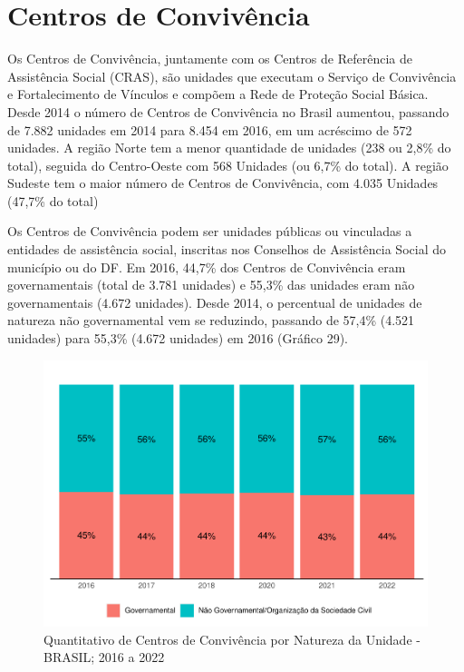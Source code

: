 \documentclass[
  brazilian]{report}
\begin{document}
\hypertarget{centros-de-convivuxeancia}{%
\section{Centros de Convivência}\label{centros-de-convivuxeancia}}

Os Centros de Convivência, juntamente com os Centros de Referência de
Assistência Social (CRAS), são unidades que executam o Serviço de
Convivência e Fortalecimento de Vínculos e compõem a Rede de Proteção
Social Básica. Desde 2014 o número de Centros de Convivência no Brasil
aumentou, passando de 7.882 unidades em 2014 para 8.454 em 2016, em um
acréscimo de 572 unidades. A região Norte tem a menor quantidade de
unidades (238 ou 2,8\% do total), seguida do Centro-Oeste com 568
Unidades (ou 6,7\% do total). A região Sudeste tem o maior número de
Centros de Convivência, com 4.035 Unidades (47,7\% do total)

Os Centros de Convivência podem ser unidades públicas ou vinculadas a
entidades de assistência social, inscritas nos Conselhos de Assistência
Social do município ou do DF. Em 2016, 44,7\% dos Centros de Convivência
eram governamentais (total de 3.781 unidades) e 55,3\% das unidades eram
não governamentais (4.672 unidades). Desde 2014, o percentual de
unidades de natureza não governamental vem se reduzindo, passando de
57,4\% (4.521 unidades) para 55,3\% (4.672 unidades) em 2016 (Gráfico
29).

\begin{figure}
\includegraphics{Censo-SUAS-2022_files/figure-latex/centro-conv-natureza-1} \caption[Quantitativo de Centros de Convivência por Natureza da Unidade - BRASIL]{Quantitativo de Centros de Convivência por Natureza da Unidade - BRASIL; 2016 a 2022}\label{fig:centro-conv-natureza}
\end{figure}
\end{document}
